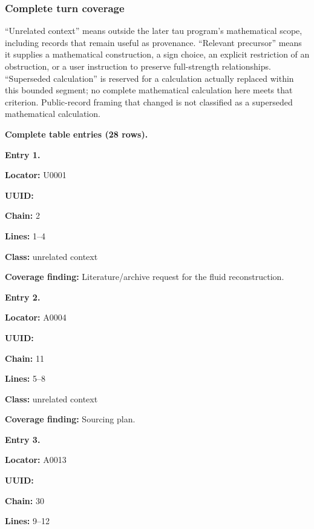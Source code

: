 \subsubsection{Complete turn coverage}\label{TranscriptLedgerStage:complete-turn-coverage}

``Unrelated context'' means outside the later tau program's mathematical
scope, including records that remain useful as provenance. ``Relevant
precursor'' means it supplies a mathematical construction, a sign
choice, an explicit restriction of an obstruction, or a user instruction
to preserve full-strength relationships. ``Superseded calculation'' is
reserved for a calculation actually replaced within this bounded
segment; no complete mathematical calculation here meets that criterion.
Public-record framing that changed is not classified as a superseded
mathematical calculation.

\textbf{Complete table entries (28 rows).}


\textbf{Entry 1.}

\textbf{Locator:} U0001

\textbf{UUID:} \protect{}

\textbf{Chain:} 2

\textbf{Lines:} 1--4

\textbf{Class:} unrelated context

\textbf{Coverage finding:} Literature/archive request for the fluid
reconstruction.


\textbf{Entry 2.}

\textbf{Locator:} A0004

\textbf{UUID:} \protect{}

\textbf{Chain:} 11

\textbf{Lines:} 5--8

\textbf{Class:} unrelated context

\textbf{Coverage finding:} Sourcing plan.


\textbf{Entry 3.}

\textbf{Locator:} A0013

\textbf{UUID:} \protect{}

\textbf{Chain:} 30

\textbf{Lines:} 9--12

